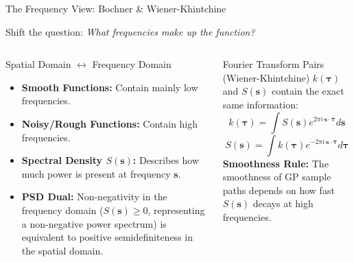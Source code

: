 \documentclass[aspectratio=169, 10pt]{beamer}
\begin{document}
\begin{frame}{The Frequency View: Bochner \& Wiener-Khintchine}
  
  Shift the question: \emph{What frequencies make up the function?}
  
  \begin{columns}[t]
      \begin{block}{Spatial Domain $\leftrightarrow$ Frequency Domain}
        \scriptsize
        \begin{itemize}
          \item \textbf{Smooth Functions:} Contain mainly low frequencies.
          \item \textbf{Noisy/Rough Functions:} Contain high frequencies.
          \item \textbf{Spectral Density $S(\mathbf{s})$:} Describes how much power is present at frequency $\mathbf{s}$.
          \item \textbf{PSD Dual:} Non-negativity in the frequency domain ($S(\mathbf{s}) \ge 0$, representing a non-negative power spectrum) is equivalent to positive semidefiniteness in the spatial domain.
        \end{itemize}
      \end{block}
      
      \begin{block}{Fourier Transform Pairs (Wiener-Khintchine)}
        \scriptsize
        $k(\boldsymbol{\tau})$ and $S(\mathbf{s})$ contain the exact same information:
        \[
          k(\boldsymbol{\tau}) = \int S(\mathbf{s}) e^{2\pi i \, \mathbf{s} \cdot \boldsymbol{\tau}} d\mathbf{s}
        \]
        \[
          S(\mathbf{s}) = \int k(\boldsymbol{\tau}) e^{-2\pi i \, \mathbf{s} \cdot \boldsymbol{\tau}} d\boldsymbol{\tau}
        \]
        \textbf{Smoothness Rule:} The smoothness of GP sample paths depends on how fast $S(\mathbf{s})$ decays at high frequencies.
      \end{block}
  \end{columns}
\end{frame}
\end{document}

